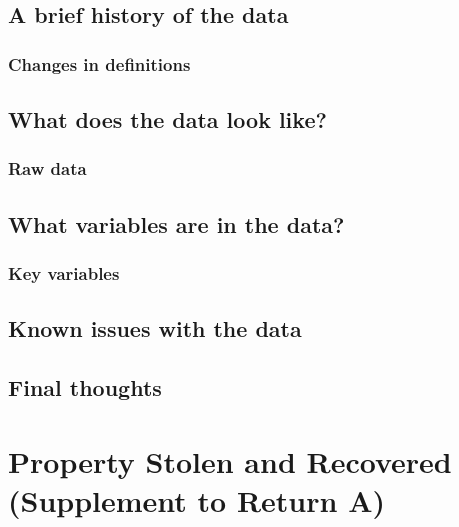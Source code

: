 \documentclass[
  12pt,
  openany]{book}
\begin{document}
\hypertarget{a-brief-history-of-the-data-4}{%
\section{A brief history of the data}\label{a-brief-history-of-the-data-4}}

\hypertarget{changes-in-definitions-4}{%
\subsection{Changes in definitions}\label{changes-in-definitions-4}}

\hypertarget{what-does-the-data-look-like-4}{%
\section{What does the data look like?}\label{what-does-the-data-look-like-4}}

\hypertarget{raw-data-2}{%
\subsection{Raw data}\label{raw-data-2}}

\hypertarget{what-variables-are-in-the-data-4}{%
\section{What variables are in the data?}\label{what-variables-are-in-the-data-4}}

\hypertarget{key-variables-4}{%
\subsection{Key variables}\label{key-variables-4}}

\hypertarget{known-issues-with-the-data-4}{%
\section{Known issues with the data}\label{known-issues-with-the-data-4}}

\hypertarget{final-thoughts-4}{%
\section{Final thoughts}\label{final-thoughts-4}}

\hypertarget{stolen_property}{%
\chapter{Property Stolen and Recovered (Supplement to Return A)}\label{stolen_property}}
\end{document}
